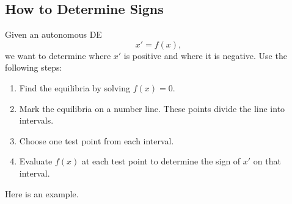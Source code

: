 \documentclass[09pt,letterpaper]{article}
\begin{document}

\subsection{How to Determine Signs}
Given an autonomous DE
\[
x' = f(x),
\]
we want to determine where $x'$ is positive and where it is negative. Use the following steps:
\begin{enumerate}
    \item Find the equilibria by solving $f(x)=0$.
    \item Mark the equilibria on a number line. These points divide the line into intervals.
    \item Choose one test point from each interval.
    \item Evaluate $f(x)$ at each test point to determine the sign of $x'$ on that interval.
\end{enumerate}
Here is an example.
\end{document}
